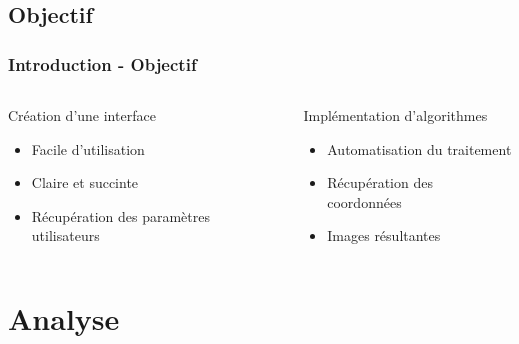 \documentclass[11pt]{beamer}
\begin{document}
\subsection{Objectif}
\begin{frame}
\frametitle{Introduction - Objectif}
	\begin{columns}[t]
		
		\begin{column}{4.5cm}
			\begin{block}{Création d'une interface}
				\begin{itemize}
					\item Facile d'utilisation
					\item Claire et succinte
					\item Récupération des paramètres utilisateurs
				\end{itemize}
			\end{block}
		\end{column}
		\begin{column}{6.5cm}
		    \begin{block}{Implémentation d'algorithmes}
				\begin{itemize}
					\item Automatisation du traitement
					\item Récupération des coordonnées
					\item Images résultantes
				\end{itemize}
			\end{block}
		\end{column}
	\end{columns}
\end{frame}

\section{Analyse}
\end{document}
